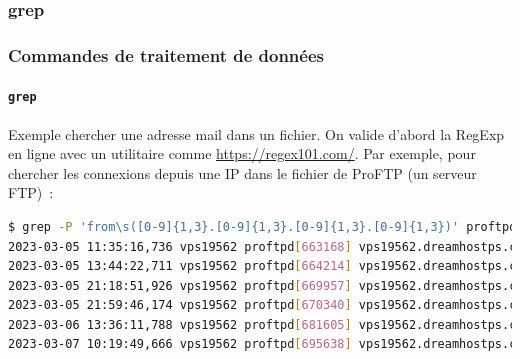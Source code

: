 \documentclass{beamer}
\begin{document}
    \subsubsection{grep}\label{subsubsec:grep}
    \begin{frame}[fragile]
        \transdissolve
        \frametitle{Commandes de traitement de données}
        \framesubtitle{\lstinline{grep}}
        Exemple chercher une adresse mail dans un fichier.
        \bigbreak
        On valide d'abord la RegExp en ligne avec un utilitaire comme \url{https://regex101.com/}.
        \bigbreak
        Par exemple, pour chercher les connexions depuis une IP dans le fichier de ProFTP (un serveur FTP)~:
        \begin{lstlisting}[language=bash,basicstyle=\tiny\ttfamily]
$ grep -P 'from\s([0-9]{1,3}.[0-9]{1,3}.[0-9]{1,3}.[0-9]{1,3})' proftpd.log.1
2023-03-05 11:35:16,736 vps19562 proftpd[663168] vps19562.dreamhostps.com (104.156.155.30[104.156.155.30]): USER anonymous: no such user found from 104.156.155.30 [104.156.155.30] to ::ffff:66.33.201.239:21
2023-03-05 13:44:22,711 vps19562 proftpd[664214] vps19562.dreamhostps.com (183.127.77.34.bc.googleusercontent.com[34.77.127.183]): USER anonymous: no such user found from 183.127.77.34.bc.googleusercontent.com [34.77.127.183] to ::ffff:66.33.201.239:21
2023-03-05 21:18:51,926 vps19562 proftpd[669957] vps19562.dreamhostps.com (182.176.228.148[182.176.228.148]): USER local: no such user found from 182.176.228.148 [182.176.228.148] to ::ffff:66.33.201.239:21
2023-03-05 21:59:46,174 vps19562 proftpd[670340] vps19562.dreamhostps.com (107.150.102.211[107.150.102.211]): USER anonymous: no such user found from 107.150.102.211 [107.150.102.211] to ::ffff:66.33.201.239:21
2023-03-06 13:36:11,788 vps19562 proftpd[681605] vps19562.dreamhostps.com (116.62.233.35.bc.googleusercontent.com[35.233.62.116]): USER anonymous: no such user found from 116.62.233.35.bc.googleusercontent.com [35.233.62.116] to ::ffff:66.33.201.239:21
2023-03-07 10:19:49,666 vps19562 proftpd[695638] vps19562.dreamhostps.com (116.62.233.35.bc.googleusercontent.com[35.233.62.116]): USER anonymous: no such user found from 116.62.233.35.bc.googleusercontent.com [35.233.62.116] to ::ffff:66.33.201.239:21
        \end{lstlisting}
    \end{frame}
\end{document}
